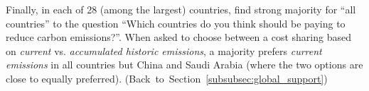 Finally, in each of 28 (among the largest) countries,  find strong majority for ``all countries'' to the question ``Which countries do you think should be paying to reduce carbon emissions?''. When asked to choose between a cost sharing based on \textit{current} vs. \textit{accumulated historic emissions}, a majority prefers \textit{current emissions} in all countries but China and Saudi Arabia (where the two options are close to equally preferred). \hfill (Back~to~Section~\ref{subsubsec:global_support}) %


